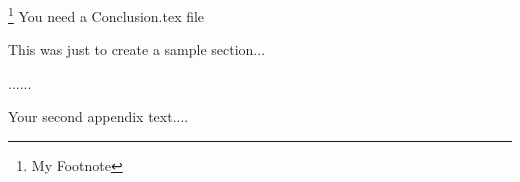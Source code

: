 \documentclass{iitthesis}
\begin{document}
\footnote{My Footnote} 
%   
You need a Conclusion.tex file



This was just to create a sample section...

\clearpage


%
%
\appendix


......



Your second appendix text....

\newpage
%
%


\end{document}
